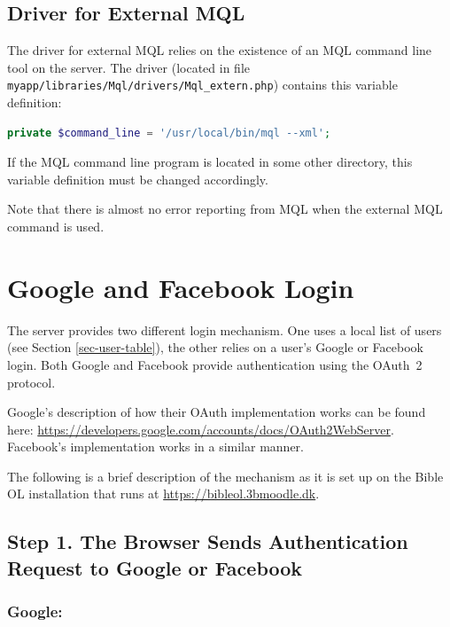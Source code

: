 \documentclass[11pt,oneside,a4paper]{memoir}
\begin{document}
\subsection{Driver for External MQL}\label{sec-mql-extern}

The driver for external MQL relies on the existence of an MQL command line tool on the server. The
driver (located in file \texttt{myapp/libraries/Mql/drivers/Mql\_extern.php}) contains this variable
definition:

\begin{lstlisting}[language=PHP]
private $command_line = '/usr/local/bin/mql --xml';
\end{lstlisting}

If the MQL command line program is located in some other directory, this variable definition must be
changed accordingly.

Note that there is almost no error reporting from MQL when the external MQL command is used.


\section{Google and Facebook Login}\label{sec-oauth-login}

The server provides two different login mechanism. One uses a local list of users
(see Section \ref{sec-user-table}), the other relies on a user's Google or Facebook login. Both
Google and Facebook provide authentication using the OAuth~2 protocol.

Google's description of how their OAuth implementation works can be found here:
\url{https://developers.google.com/accounts/docs/OAuth2WebServer}. Facebook's implementation works
in a similar manner.

The following is a brief description of the mechanism as it is set up on the Bible OL installation
that runs at \url{https://bibleol.3bmoodle.dk}.

\subsection*{Step 1. The Browser Sends Authentication Request to Google or Facebook}

\subsubsection*{Google:}
\end{document}
